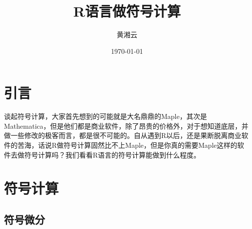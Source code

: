 \documentclass[a4paper]{ctexart}\usepackage[]{graphicx}\usepackage[]{color}
\begin{document}
\title{R语言做符号计算}
\author{黄湘云}
\date{\today}
\maketitle

\tableofcontents
\newpage





\section{引言}
谈起符号计算，大家首先想到的可能就是大名鼎鼎的Maple，其次是Mathematica，但是他们都是商业软件，除了昂贵的价格外，对于想知道底层，并做一些修改的极客而言，都是很不可能的。自从遇到R以后，还是果断脱离商业软件的苦海，话说R做符号计算固然比不上Maple，但是你真的需要Maple这样的软件去做符号计算吗？我们看看R语言的符号计算能做到什么程度。

\section{符号计算}


\subsection{符号微分}
\end{document}
